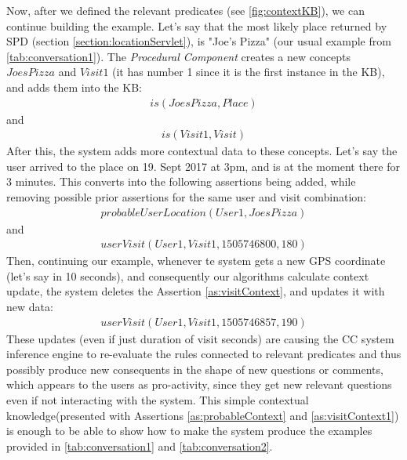 Now, after we defined the relevant predicates (see \autoref{fig:contextKB}), we 
can continue building the example.
Let's say that the most likely place returned by SPD
(section \ref{section:locationServlet}), is "Joe's Pizza"
(our usual example from \autoref{tab:conversation1}). The 
\emph{Procedural Component} creates a new concepts  $JoesPizza$ and 
$Visit1$ (it has number 1 since it is the first instance in the KB), and adds 
them into the KB:
\begin{equation}\label{as:joesPizza}
\begin{gathered}
	is(JoesPizza,Place)
\end{gathered}
\end{equation}
and
\begin{equation}\label{as:visit1}
\begin{gathered}
	is(Visit1,Visit)
\end{gathered}
\end{equation}
After this, the system adds more contextual data to these concepts. Let's say
the user arrived to the place on 19. Sept 2017 at 3pm, and is at the moment
there for 3 minutes. This converts into the following assertions being added, 
while removing possible prior assertions for the same user and visit 
combination:
\begin{equation}\label{as:probableContext}
\begin{gathered}
	probableUserLocation(User1,JoesPizza)
\end{gathered}
\end{equation}
and
\begin{equation}\label{as:visitContext}
\begin{gathered}
	userVisit(User1,Visit1,1505746800,180)
\end{gathered}
\end{equation}
Then, continuing our example, whenever te system gets a new GPS coordinate
(let's say in 10 seconds), and consequently our algorithms calculate context 
update, the system deletes the Assertion \ref{as:visitContext}, and updates it
with new data:
\begin{equation}\label{as:visitContext1}
\begin{gathered}
	userVisit(User1,Visit1,1505746857,190)
\end{gathered}
\end{equation}
These updates (even if just duration of visit seconds) are causing the CC 
system inference engine to re-evaluate the rules connected to relevant 
predicates and thus possibly produce new consequents in the shape of new 
questions or comments, which appears to the users as pro-activity, since they 
get new relevant questions even if not interacting with the system.
This simple contextual knowledge(presented with Assertions 
\ref{as:probableContext} and \ref{as:visitContext1}) is enough to be able to 
show how to make the system produce the examples provided in 
\autoref{tab:conversation1} and \autoref{tab:conversation2}.

